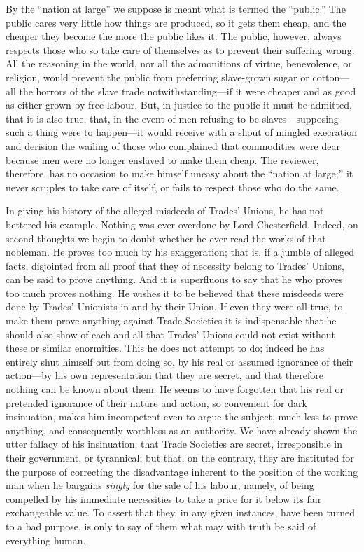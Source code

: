 By the ``nation at large'' we suppose is meant what is termed the
``public.'' The public cares very little how things are produced, so it
gets them cheap, and the cheaper they become the more the public likes
it. The public, however, always respects those who so take care of
themselves as to prevent their suffering wrong. All the reasoning in the
world, nor all the admonitions of virtue, benevolence, or religion,
would prevent the public from preferring slave-grown sugar or
cotton---all the horrors of the slave trade notwithstanding---if it were
cheaper and as good as either grown by free labour. But, in justice to
the public it must be admitted, that it is also true, that, in the event
of men refusing to be slaves---supposing such a thing were to
happen---it would receive with a shout of mingled execration and
derision the wailing of those who complained that commodities were dear
because men were no longer enslaved to make them cheap. The reviewer,
therefore, has no occasion to make himself uneasy about the ``nation at
large;'' it never scruples to take care of itself, or fails to respect
those who do the same.

In giving his history of the alleged misdeeds of Trades' Unions, he has
not bettered his example. Nothing was ever overdone by Lord
Chesterfield. Indeed, on second thoughts we begin to doubt whether he
ever read the works of that nobleman. He proves too much by his
exaggeration; that is, if a jumble of alleged facts, disjointed from all
proof that they of necessity belong to Trades' Unions, can be said to
prove anything. And it is superfluous to say that he who proves too much
proves nothing. He wishes it to be believed that these misdeeds were
done by Trades' Unionists in and by their Union. If even they were all
true, to make them prove anything against Trade Societies it is
indispensable that he should also show of each and all that Trades'
Unions could not exist without these or similar enormities. This he does
not attempt to do; indeed he has entirely shut himself out from doing
so, by his real or assumed ignorance of their action---by his own
representation that they are secret, and that therefore nothing can be
known about them. He seems to have forgotten that his real or pretended
ignorance of their nature and action, so convenient for dark
insinuation, makes him incompetent even to argue the subject, much less
to prove anything, and consequently worthless as an authority. We have
already shown the utter fallacy of his insinuation, that Trade Societies
are secret, irresponsible in their government, or tyrannical; but that,
on the contrary, they are instituted for the purpose of correcting the
disadvantage inherent to the position of the working man when he
bargains \textit{singly} for the sale of his labour, namely, of being
compelled by his immediate necessities to take a price for it below its
fair exchangeable value. To assert that they, in any given instances,
have been turned to a bad purpose, is only to say of them what may with
truth be said of everything human.

